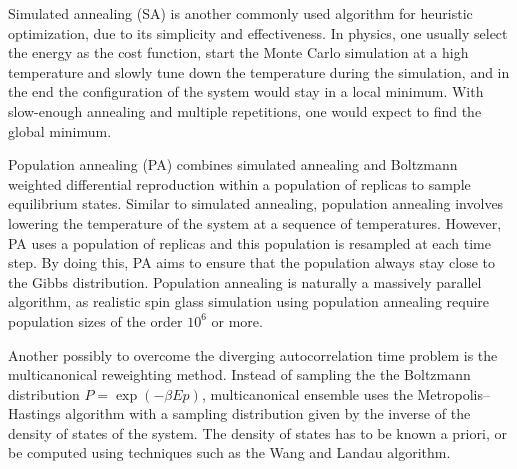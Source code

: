 Simulated annealing (SA) is another commonly used algorithm for heuristic optimization,
due to its simplicity and effectiveness. In physics, one usually select the 
energy as the cost function, start the Monte Carlo simulation at a high temperature
and slowly tune down the temperature during the simulation, and in the end the
configuration of the system would stay in a local minimum. With slow-enough annealing
and multiple repetitions, one would expect to find the global minimum.  

Population annealing (PA) combines simulated annealing and Boltzmann weighted 
differential reproduction within a population of replicas to sample equilibrium 
states. Similar to simulated annealing, population annealing involves lowering 
the temperature of the system at a sequence of temperatures. However, PA uses a 
population of replicas and this population is resampled at each time step.
By doing this, PA aims to ensure that the population always stay close to the 
Gibbs distribution. Population annealing is naturally a massively
parallel algorithm, as realistic spin glass simulation using population 
annealing require population sizes of the order $10^6$ or more.

Another possibly to overcome the diverging autocorrelation time problem is the 
multicanonical reweighting method. Instead of sampling the the Boltzmann 
distribution $P=\exp(-\beta Ep)$, multicanonical ensemble uses the 
Metropolis–Hastings algorithm with a sampling distribution given by the inverse 
of the density of states of the system. The density of states has to be known 
a priori, or be computed using techniques such as the Wang and Landau algorithm.






